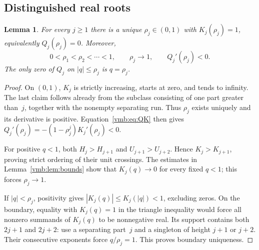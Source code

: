 \documentclass[11pt,a4paper]{article}
\numberwithin{equation}{section}
\newtheorem{lemma}[theorem]{Lemma}
\theoremstyle{definition}\newtheorem{definition}[theorem]{Definition}
\theoremstyle{remark}\newtheorem{remark}[theorem]{Remark}
\begin{document}
\subsection{Distinguished real roots}
\begin{lemma}\label{vmb:lem:roots}
For every \(j\geq1\) there is a unique \(\rho_j\in(0,1)\) with
\(K_j(\rho_j)=1\), equivalently \(Q_j(\rho_j)=0\). Moreover,
\begin{equation}\label{vmb:eq:rholadder}
0<\rho_1<\rho_2<\cdots<1,
\qquad \rho_j\longrightarrow1,
\qquad Q_j'(\rho_j)<0.
\end{equation}
The only zero of \(Q_j\) on \(|q|\leq\rho_j\) is \(q=\rho_j\).
\end{lemma}
\begin{proof}
On \((0,1)\), \(K_j\) is strictly increasing, starts at zero, and tends
to infinity. The last claim follows already from the subclass consisting
of one part greater than~\(j\), together with the nonempty separating
run. Thus \(\rho_j\) exists uniquely and its derivative is positive.
Equation~\eqref{vmb:eq:QK} then gives
\(Q_j'(\rho_j)=-(1-\rho_j^j)K_j'(\rho_j)<0\).

For positive \(q<1\), both \(H_j>H_{j+1}\) and
\(U_{j+1}>U_{j+2}\). Hence \(K_j>K_{j+1}\), proving strict ordering
of their unit crossings. The estimates in Lemma~\ref{vmb:lem:bounds} show
that \(K_j(q)\to0\) for every fixed \(q<1\); this forces
\(\rho_j\to1\).

If \(|q|<\rho_j\), positivity gives
\(|K_j(q)|\leq K_j(|q|)<1\), excluding zeros. On the boundary,
equality with \(K_j(q)=1\) in the triangle inequality would force all
nonzero summands of \(K_j(q)\) to be nonnegative real. Its support
contains both \(2j+1\) and \(2j+2\): use a separating part~\(j\) and
a singleton of height \(j+1\) or \(j+2\). Their consecutive exponents
force \(q/\rho_j=1\). This proves boundary uniqueness.
\end{proof}
\end{document}
